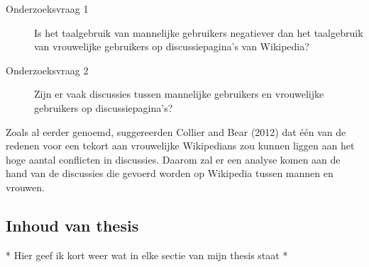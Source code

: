 \begin{description}
\item[Onderzoeksvraag 1] Is het taalgebruik van mannelijke gebruikers negatiever dan het taalgebruik van vrouwelijke gebruikers op discussiepagina's van Wikipedia?
\end{description}


\begin{description}
\item[Onderzoeksvraag 2] Zijn er vaak discussies tussen mannelijke gebruikers en vrouwelijke gebruikers op discussiepagina's?
\end{description}

Zoals al eerder genoemd, suggereerden Collier and Bear (2012) dat \'e\'en
van de redenen voor een tekort aan vrouwelijke Wikipedians zou kunnen liggen aan het hoge aantal conflicten in discussies. Daarom zal er een analyse komen aan de hand van de discussies die gevoerd worden op Wikipedia tussen mannen en vrouwen.




\subsection{Inhoud van thesis}
* Hier geef ik kort weer wat in elke sectie van mijn thesis staat *
